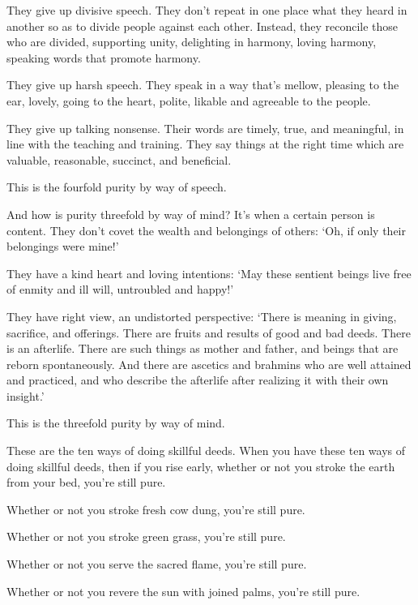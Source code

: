 \documentclass[12pt,openany]{book}%
\begin{document}
They give up divisive speech. They don’t repeat in one place what they heard in another so as to divide people against each other. Instead, they reconcile those who are divided, supporting unity, delighting in harmony, loving harmony, speaking words that promote harmony. 

They give up harsh speech. They speak in a way that’s mellow, pleasing to the ear, lovely, going to the heart, polite, likable and agreeable to the people. 

They give up talking nonsense. Their words are timely, true, and meaningful, in line with the teaching and training. They say things at the right time which are valuable, reasonable, succinct, and beneficial. 

This is the fourfold purity by way of speech. 

And how is purity threefold by way of mind? It’s when a certain person is content. They don’t covet the wealth and belongings of others: ‘Oh, if only their belongings were mine!’ 

They have a kind heart and loving intentions: ‘May these sentient beings live free of enmity and ill will, untroubled and happy!’ 

They have right view, an undistorted perspective: ‘There is meaning in giving, sacrifice, and offerings. There are fruits and results of good and bad deeds. There is an afterlife. There are such things as mother and father, and beings that are reborn spontaneously. And there are ascetics and brahmins who are well attained and practiced, and who describe the afterlife after realizing it with their own insight.’ 

This is the threefold purity by way of mind. 

These are the ten ways of doing skillful deeds. When you have these ten ways of doing skillful deeds, then if you rise early, whether or not you stroke the earth from your bed, you’re still pure. 

Whether or not you stroke fresh cow dung, you’re still pure. 

Whether or not you stroke green grass, you’re still pure. 

Whether or not you serve the sacred flame, you’re still pure. 

Whether or not you revere the sun with joined palms, you’re still pure. 
\end{document}
